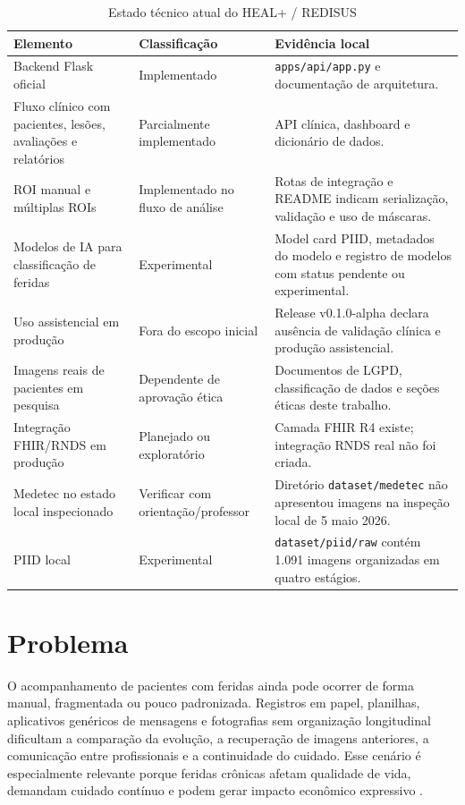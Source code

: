\documentclass[
    12pt,
    oneside,
    a4paper,
    chapter=TITLE,
    brazil,
    sumario=tradicional,
    hidelinks
]{abntex2}
\begin{document}
\begin{table}[htbp]
    \centering
    \caption{\label{tab:status-repo}Estado técnico atual do HEAL+ / REDISUS}
    \begin{tabular}{L{4.0cm}L{4.0cm}L{5.0cm}}
        \toprule
        \textbf{Elemento} & \textbf{Classificação} & \textbf{Evidência local} \\
        \midrule
        Backend Flask oficial & Implementado & \texttt{apps/api/app.py} e documentação de arquitetura. \\
        Fluxo clínico com pacientes, lesões, avaliações e relatórios & Parcialmente implementado & API clínica, dashboard e dicionário de dados. \\
        ROI manual e múltiplas ROIs & Implementado no fluxo de análise & Rotas de integração e README indicam serialização, validação e uso de máscaras. \\
        Modelos de IA para classificação de feridas & Experimental & Model card PIID, metadados do modelo e registro de modelos com status pendente ou experimental. \\
        Uso assistencial em produção & Fora do escopo inicial & Release v0.1.0-alpha declara ausência de validação clínica e produção assistencial. \\
        Imagens reais de pacientes em pesquisa & Dependente de aprovação ética & Documentos de LGPD, classificação de dados e seções éticas deste trabalho. \\
        Integração FHIR/RNDS em produção & Planejado ou exploratório & Camada FHIR R4 existe; integração RNDS real não foi criada. \\
        Medetec no estado local inspecionado & Verificar com orientação/professor & Diretório \texttt{dataset/medetec} não apresentou imagens na inspeção local de 5 maio 2026. \\
        PIID local & Experimental & \texttt{dataset/piid/raw} contém 1.091 imagens organizadas em quatro estágios. \\
        \bottomrule
    \end{tabular}
\end{table}

\chapter{Problema}

O acompanhamento de pacientes com feridas ainda pode ocorrer de forma manual, fragmentada ou pouco padronizada. Registros em papel, planilhas, aplicativos genéricos de mensagens e fotografias sem organização longitudinal dificultam a comparação da evolução, a recuperação de imagens anteriores, a comunicação entre profissionais e a continuidade do cuidado. Esse cenário é especialmente relevante porque feridas crônicas afetam qualidade de vida, demandam cuidado contínuo e podem gerar impacto econômico expressivo \cite{olsson2019,sen2019}.
\end{document}
